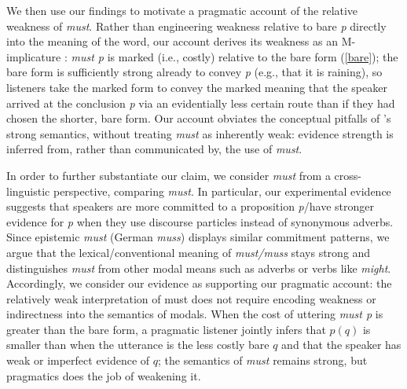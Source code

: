 \documentclass[11pt]{article}
\begin{document}
We then use our findings to motivate a pragmatic account of the relative weakness of \emph{must}. Rather than engineering weakness relative to bare \emph{p} directly into the meaning of the word, our account derives its weakness as an M-implicature \cite{grice1989,levinson2000}: \emph{must p} is marked (i.e., costly) relative to the bare form (\ref{bare}); the bare form is sufficiently strong already to convey \emph{p} (e.g., that it is raining), so listeners take the marked form to convey the marked meaning that the speaker arrived at the conclusion \emph{p} via an evidentially less certain route than if they had chosen the shorter, bare form. Our account obviates the conceptual pitfalls of \citeauthor{vonfintelgillies2010}'s strong semantics, without treating \emph{must} as inherently weak: evidence strength is inferred from, rather than communicated by, the use of \emph{must}. 

In order to further substantiate our claim, we consider \emph{must} from a cross-linguistic perspective, comparing \emph{must}. In particular, our experimental evidence suggests that speakers are more committed to a proposition \emph{p}/have stronger evidence for \emph{p} when they use discourse particles instead of synonymous adverbs. Since epistemic \emph{must} (German \emph{muss}) displays similar commitment patterns, we argue that the lexical/conventional meaning of \emph{must/muss} stays strong and distinguishes \emph{must} from other modal means such as adverbs or verbs like \emph{might}. Accordingly, we consider our evidence as supporting our pragmatic account: the relatively weak interpretation of must does not require encoding weakness or indirectness into the semantics of modals. When the cost of uttering \emph{must p} is greater than the bare form, a pragmatic listener jointly infers that $p(q)$ is smaller than when the utterance is the less costly bare $q$ and that the speaker has weak or imperfect evidence of $q$; the semantics of \emph{must} remains strong, but pragmatics does the job of weakening it.

\end{document}

